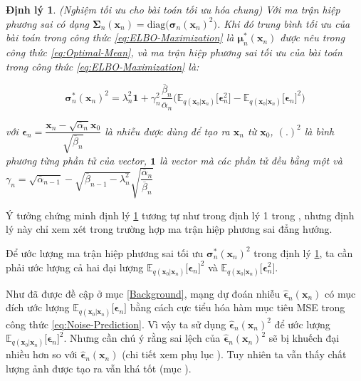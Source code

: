 \documentclass[14pt, a4paper]{article}
\numberwithin{equation}{section}
\numberwithin{figure}{section}
\newtheorem{dl}{Định lý}
\numberwithin{dl}{section}
\numberwithin{md}{section}
\numberwithin{bd}{section}
\numberwithin{dn}{section}
\numberwithin{hq}{section}
\begin{document}
    \begin{dl} \label{dl:Optimal-Solution-To-Joint-Optimization}
        (Nghiệm tối ưu cho bài toán tối ưu hóa chung) 
        Với ma trận hiệp phương sai có dạng $\boldsymbol{\Sigma}_n (\boldsymbol{x}_n)=\mathrm{diag}\big( \boldsymbol{\sigma}_n (\boldsymbol{x}_n)^2 \big)$.
        Khi đó trung bình tối ưu của bài toán trong công thức \ref{eq:ELBO-Maximization} là $\boldsymbol{\mu}_n^{\ast} (\boldsymbol{x}_n)$ được nêu trong công thức \ref{eq:Optimal-Mean},
        và ma trận hiệp phương sai tối ưu của bài toán trong công thức \ref{eq:ELBO-Maximization} là:


        \begin{equation*}
            \boldsymbol{\sigma}_n^{\ast} (\boldsymbol{x}_n)^2 = \lambda_n^2 \boldsymbol{1} + \gamma_n^2 \dfrac{\overline{\beta}_n}{\overline{\alpha}_n} \big( \mathbb{E}_{q(\boldsymbol{x}_0 \vert \boldsymbol{x}_n)} \lbrack \boldsymbol{\epsilon}_n^2 \rbrack - \mathbb{E}_{q(\boldsymbol{x}_0 \vert \boldsymbol{x}_n)} \lbrack \boldsymbol{\epsilon}_n \rbrack^2 \big)
        \end{equation*}

        với $\boldsymbol{\epsilon}_n = \dfrac{\boldsymbol{x}_n - \sqrt{\overline{\alpha}_n} \boldsymbol{x}_0}{\sqrt{\overline{\beta}_n}}$ là nhiễu được dùng để tạo ra $\boldsymbol{x}_n$ từ $\boldsymbol{x}_0$,
        $(.)^2$ là bình phương từng phần tử của vector, $\boldsymbol{1}$ là vector mà các phần tử đều bằng một và $\gamma_n = \sqrt{\overline{\alpha}_{n-1}} - \sqrt{\overline{\beta}_{n-1} - \lambda_n^2} \sqrt{\dfrac{\overline{\alpha}_n}{\overline{\beta}_n}}$
    \end{dl}

    Ý tưởng chứng minh định lý \ref{dl:Optimal-Solution-To-Joint-Optimization} tương tự như trong định lý 1 trong \cite{bao2021analytic}, nhưng định lý này chỉ xem xét trong trường hợp ma trận hiệp phương sai đẳng hướng.

    Để ước lượng ma trận hiệp phương sai tối ưu $\boldsymbol{\sigma}_n^{\ast} (\boldsymbol{x}_n)^2$ trong định lý \ref{dl:Optimal-Solution-To-Joint-Optimization}, ta cần phải ước lượng cả hai đại lượng $\mathbb{E}_{q(\boldsymbol{x}_0 \vert \boldsymbol{x}_n)} \lbrack \boldsymbol{\epsilon}_n \rbrack^2$ và $\mathbb{E}_{q(\boldsymbol{x}_0 \vert \boldsymbol{x}_n)} \lbrack \boldsymbol{\epsilon}_n^2 \rbrack$.

    Như đã được đề cập ở mục \ref{Background}, mạng dự đoán nhiễu $\hat{\boldsymbol{\epsilon}}_n (\boldsymbol{x}_n)$ có mục đích ước lượng $\mathbb{E}_{q(\boldsymbol{x}_0 \vert \boldsymbol{x}_n)} \lbrack \boldsymbol{\epsilon}_n \rbrack$ bằng cách cực tiểu hóa hàm mục tiêu MSE trong công thức \ref{eq:Noise-Prediction}.
    Vì vậy ta sử dụng $\hat{\boldsymbol{\epsilon}}_n (\boldsymbol{x}_n)^2$ để ước lượng $\mathbb{E}_{q(\boldsymbol{x}_0 \vert \boldsymbol{x}_n)} \lbrack \boldsymbol{\epsilon}_n \rbrack^2$.
    Nhưng cần chú ý rằng sai lệch của $\hat{\boldsymbol{\epsilon}}_n (\boldsymbol{x}_n)^2$ sẽ bị khuếch đại nhiều hơn so với $\hat{\boldsymbol{\epsilon}}_n (\boldsymbol{x}_n)$ (chi tiết xem phụ lục ).
    Tuy nhiên ta vẫn thấy chất lượng ảnh được tạo ra vẫn khá tốt (mục ).
\end{document}

